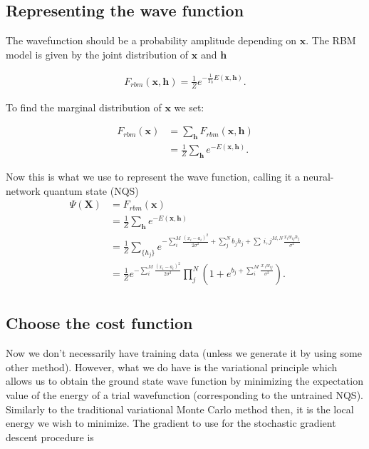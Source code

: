 \documentclass[%
oneside,                 %
final,                   %
10pt]{article}
\begin{document}
\subsection*{Representing the wave function}

The wavefunction should be a probability amplitude depending on
 $\bm{x}$. The RBM model is given by the joint distribution of
 $\bm{x}$ and $\bm{h}$

\begin{align}
        F_{rbm}(\mathbf{x},\mathbf{h}) = \frac{1}{Z} e^{-\frac{1}{T_0}E(\mathbf{x},\mathbf{h})}.
\end{align}

To find the marginal distribution of $\bm{x}$ we set:

\begin{align}
        F_{rbm}(\mathbf{x}) &= \sum_\mathbf{h} F_{rbm}(\mathbf{x}, \mathbf{h}) \\
                                &= \frac{1}{Z}\sum_\mathbf{h} e^{-E(\mathbf{x}, \mathbf{h})}.
\end{align}

Now this is what we use to represent the wave function, calling it a neural-network quantum state (NQS)
\begin{align}
        \Psi (\mathbf{X}) &= F_{rbm}(\mathbf{x}) \\
        &= \frac{1}{Z}\sum_{\bm{h}} e^{-E(\mathbf{x}, \mathbf{h})} \\
        &= \frac{1}{Z} \sum_{\{h_j\}} e^{-\sum_i^M \frac{(x_i - a_i)^2}{2\sigma^2} + \sum_j^N b_j h_j + \sum_\
{i,j}^{M,N} \frac{x_i w_{ij} h_j}{\sigma^2}} \\
        &= \frac{1}{Z} e^{-\sum_i^M \frac{(x_i - a_i)^2}{2\sigma^2}} \prod_j^N (1 + e^{b_j + \sum_i^M \frac{x\
_i w_{ij}}{\sigma^2}}). \\
\end{align}

\subsection*{Choose the cost function}

Now we don't necessarily have training data (unless we generate it by using some other method). However, what we do have is the variational principle which allows us to obtain the ground state wave function by minimizing the expectation value of the energy of a trial wavefunction (corresponding to the untrained NQS). Similarly to the traditional variational Monte Carlo method then, it is the local energy we wish to minimize. The gradient to use for the stochastic gradient descent procedure is
\end{document}
